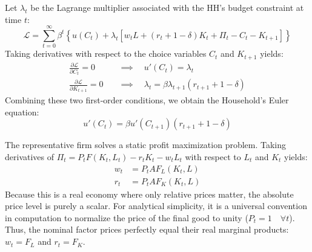 Let $\lambda_t$ be the Lagrange multiplier associated with the HH's budget constraint at time $t$:
$$
\mathcal{L} = \sum_{t=0}^\infty \beta^t \left\{ u(C_t) + \lambda_t \left[ w_t L + (r_t + 1 - \delta)K_t + \Pi_t - C_t - K_{t+1} \right] \right\}
$$
Taking derivatives with respect to the choice variables $C_t$ and $K_{t+1}$ yields:
$$
\begin{aligned}
    \frac{\partial \mathcal{L}}{\partial C_t} = 0 \quad &\implies \quad u'(C_t) = \lambda_t \\
    \frac{\partial \mathcal{L}}{\partial K_{t+1}} = 0 \quad &\implies \quad \lambda_t = \beta \lambda_{t+1} (r_{t+1} + 1 - \delta)
\end{aligned}
$$
Combining these two first-order conditions, we obtain the Household's Euler equation:
$$
u'(C_t) = \beta u'(C_{t+1}) (r_{t+1} + 1 - \delta)
$$

The representative firm solves a static profit maximization problem. Taking derivatives of $\Pi_t = P_t F(K_t, L_t) - r_t K_t - w_t L_t$ with respect to $L_t$ and $K_t$ yields:
$$
\begin{aligned}
    w_t &= P_tA F_L(K_t, L) \\
    r_t &= P_tA F_K(K_t, L) 
\end{aligned} 
$$
Because this is a real economy where only relative prices matter, the absolute price level is purely a scalar. For analytical simplicity, it is a universal convention in computation to normalize the price of the final good to unity ($P_t = 1 \quad \forall t$). Thus, the nominal factor prices perfectly equal their real marginal products: $w_t = F_L$ and $r_t = F_K$. 

